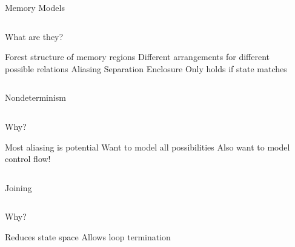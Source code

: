 \begin{frame}{Memory Models}
  \begin{columns}
    \begin{block}{What are they?}
      \begin{outline}
        \1 \alert{Forest} structure of \alert{memory regions}
        \1 Different arrangements for different possible \alert{relations}
          \2 \alert{Aliasing}
          \2 \alert{Separation}
          \2 \alert{Enclosure}
        \1 Only holds if state matches
      \end{outline}
    \end{block}

    \begin{example}
    \end{example}
  \end{columns}
\end{frame}

\begin{frame}{Nondeterminism}
  \begin{columns}
    \begin{block}{Why?}
      \begin{outline}
        \1 Most aliasing is \alert{potential}
        \1 Want to model all possibilities
        \1 Also want to model control flow!
      \end{outline}
    \end{block}

    \begin{example}[Nondeterminism]
    \end{example}
  \end{columns}
\end{frame}

\begin{frame}{Joining}
  \begin{columns}
    \begin{block}{Why?}
      \begin{outline}
        \1 Reduces state space
        \1 Allows loop termination
      \end{outline}
    \end{block}

    \begin{example}[Join]
    \end{example}
  \end{columns}
\end{frame}


